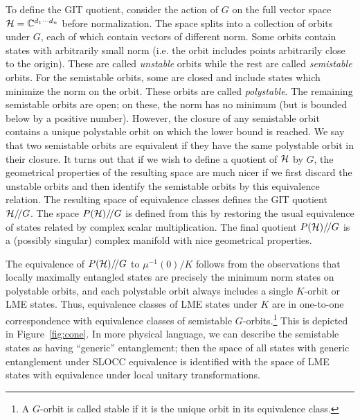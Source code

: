 \documentclass[12pt]{article}
\theoremstyle{definition}
\newcommand{\GITquot}{/\!/}
\begin{document}
To define the GIT quotient, consider the action of $G$ on the full
vector space ${\cal H} = \mathbb{C}^{d_1 \cdots d_n}$ before
normalization. The space splits into a collection of orbits under $G$,
each of which contain vectors of different norm. Some orbits contain
states with arbitrarily small norm (i.e. the orbit includes points
arbitrarily close to the origin). These are called {\it unstable}
orbits while the rest are called {\it semistable} orbits. For the
semistable orbits, some are closed and include states which minimize
the norm on the orbit. These orbits are called {\it polystable}. The
remaining semistable orbits are open; on these, the norm has no
minimum (but is bounded below by a positive number). However, the
closure of any semistable orbit contains a unique polystable orbit on
which the lower bound is reached. We say that two semistable orbits
are equivalent if they have the same polystable orbit in their
closure. It turns out that if we wish to define a quotient of ${\cal
H}$ by $G$, the geometrical properties of the resulting space are much
nicer if we first discard the unstable orbits and then identify the
semistable orbits by this equivalence relation. The resulting space of
equivalence classes defines the GIT quotient ${\cal H}\GITquot G$. The
space $P({\cal H})\GITquot G$ is defined from this by restoring the
usual equivalence of states related by complex scalar
multiplication. The final quotient $P({\cal H})\GITquot G$ is a
(possibly singular) complex manifold with nice geometrical properties.

The equivalence of $P({\cal H})\GITquot G$ to $\mu^{-1}(0)/K$ follows
from the observations that locally maximally entangled states are
precisely the minimum norm states on polystable orbits, and each
polystable orbit always includes a single $K$-orbit or LME
states. Thus, equivalence classes of LME states under $K$ are in
one-to-one correspondence with equivalence classes of semistable
$G$-orbits.\footnote{A $G$-orbit is called {stable} if it is the unique orbit in its equivalence class.}
This is depicted in Figure~\ref{fig:cone}. In more
physical language, we can describe the semistable states as having
``generic'' entanglement; then the space of all states with generic
entanglement under SLOCC equivalence is identified with the space of
LME states with equivalence under local unitary transformations.
\end{document}
